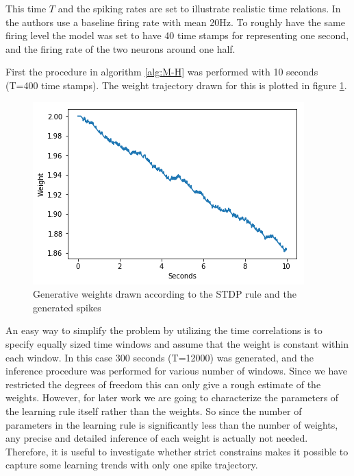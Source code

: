 This time $T$ and the spiking rates are set to illustrate realistic time relations. In \cite{Linderman} the authors use a baseline firing rate with mean 20Hz. To roughly have the same firing level the model was set to have 40 time stamps for representing one second, and the firing rate of the two neurons around one half. 

First the procedure in algorithm \ref{alg:M-H} was performed with 10 seconds (T=400 time stamps). The weight trajectory drawn for this is plotted in figure \ref{fig:w_STDP}. 


\begin{figure}[hbt!]
\caption{Generative weights drawn according to the STDP rule and the generated spikes}
\label{fig:w_STDP}
    \centering
    \includegraphics[scale=0.8]{fig/LR_underllying.png}
\end{figure}

An easy way to simplify the problem by utilizing the time correlations is to specify equally sized time windows and assume that the weight is constant within each window. In this case 300 seconds (T=12000) was generated, and the inference procedure was performed for various number of windows. Since we have restricted the degrees of freedom this can only give a rough estimate of the weights. However, for later work we are going to characterize the parameters of the learning rule itself rather than the weights. So since the number of parameters in the learning rule is significantly less than the number of weights, any precise and detailed inference of each weight is actually not needed. Therefore, it is useful to investigate whether strict constrains makes it possible to capture some learning trends with only one spike trajectory.




